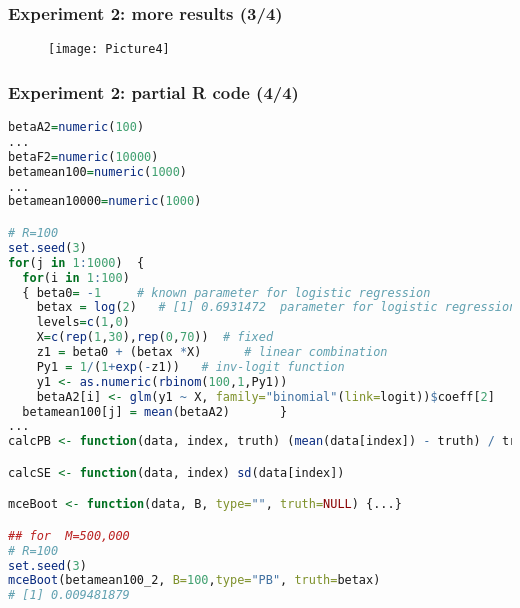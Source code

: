 \documentclass[border=5mm, convert, usenames, dvipsnames,beamer]{standalone}
\begin{document}
\begin{frame}[ fragile]{}

\frametitle{Experiment 2: more results (3/4)}


\vspace{15mm}
\noindent
\begin{figure}[h!]
\begin{center}
\texttt{[image: Picture4]}
\caption{}
\end{center}
\end{figure}





\end{frame}





\begin{frame}[ fragile]{}

\frametitle{Experiment 2: partial R code (4/4)}

\vspace{30}
\noindent


\par
\tiny
\begin{lstlisting}[language=R]
betaA2=numeric(100)
...
betaF2=numeric(10000)
betamean100=numeric(1000)
...
betamean10000=numeric(1000)

# R=100
set.seed(3)
for(j in 1:1000)  {
  for(i in 1:100)
  { beta0= -1     # known parameter for logistic regression
    betax = log(2)   # [1] 0.6931472  parameter for logistic regression
    levels=c(1,0)
    X=c(rep(1,30),rep(0,70))  # fixed
    z1 = beta0 + (betax *X)      # linear combination 
    Py1 = 1/(1+exp(-z1))   # inv-logit function
    y1 <- as.numeric(rbinom(100,1,Py1))
    betaA2[i] <- glm(y1 ~ X, family="binomial"(link=logit))$coeff[2]      }
  betamean100[j] = mean(betaA2)       }
...
calcPB <- function(data, index, truth) (mean(data[index]) - truth) / truth * 100

calcSE <- function(data, index) sd(data[index])

mceBoot <- function(data, B, type="", truth=NULL) {...}

## for  M=500,000
# R=100
set.seed(3)
mceBoot(betamean100_2, B=100,type="PB", truth=betax)
# [1] 0.009481879
\end{lstlisting}

\par
\end{frame}
\end{document}
